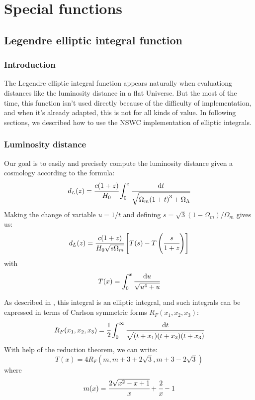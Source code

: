\chapter{Special functions}
%
\section{Legendre elliptic integral function}
%
\subsection{Introduction}
%
The Legendre elliptic integral function appears naturally when evaluationg
distances like the luminosity distance in a flat Universe. But the most of the
time, this function isn't used directly because of the difficulty of
implementation, and when it's already adapted, this is not for all kinds of
value. In following sections, we described how to use the NSWC implementation
of elliptic integrals.
%
\subsection{Luminosity distance}
%
Our goal is to easily and precisely compute the luminosity distance given a
cosmology according to the formula:
%
\begin{equation}
    d_L(z)=\cfrac{c(1+z)}{H_0}\int_0^z\cfrac{{\rm{d}}{t}}{\sqrt{\Omega_m{(1+t)}^3+\Omega_\Lambda}}
\end{equation}
%
Making the change of variable $u=1/t$ and defining
$s=\sqrt{3}{(1-\Omega_m)/\Omega_m}$ gives us:
%
\begin{equation}
    d_L(z)=\cfrac{c(1+z)}{H_0\sqrt{s\Omega_m}}\left[T(s)-T\left(\cfrac{s}{1+z}\right)\right]
\end{equation}
%
with
%
\begin{equation}
    T(x)=\int_0^x\cfrac{{\rm{d}}{u}}{\sqrt{u^4+u}}
\end{equation}

As described in \citet{Liu11}, this integral is an elliptic integral, and such
integrals can be expressed in terms of Carlson symmetric forms
$R_F(x_1,x_2,x_3)$:
%
\begin{equation}
    R_F(x_1,x_2,x_3)=\cfrac{1}{2}\int_0^\infty\cfrac{{\rm{d}}{t}}{\sqrt{(t+x_1)(t+x_2)(t+x_3)}}
\end{equation}
%
With help of the reduction theorem, we can write: 
%
\begin{equation}
    T(x)=4R_F(m,m+3+2\sqrt{3},m+3-2\sqrt{3})
\end{equation}
%
where
%
\begin{equation}
    m(x)=\cfrac{2\sqrt{x^2-x+1}}{x}+\cfrac{2}{x}-1
\end{equation}
%
